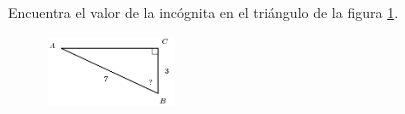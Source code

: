 \question[15]  Encuentra el valor de la incógnita en el triángulo de la figura \ref{fig:angle_functrig_13}.
\begin{figure}[H]
    \begin{center}
        \includegraphics[width=0.3\textwidth]{../images/angle_functrig_13.png}
    \end{center}
    \caption{}
    \label{fig:angle_functrig_13}
\end{figure}